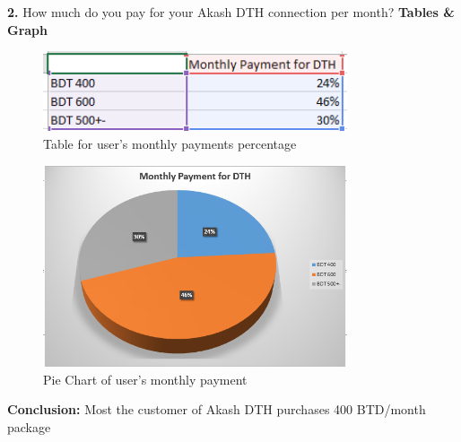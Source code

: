 \begin{spacing}{1}
{\bf 2.} How much do you pay for your Akash DTH connection per month?\newline
{\bf Tables \& Graph}\newline
\begin{figure}[H]
	\centering
	\includegraphics[width=0.8\textwidth]{fig2_1}
	\caption{Table for user's monthly payments percentage}
	\label{fig:Table1}
\end{figure}
\begin{figure}[H]
	\centering
	\includegraphics[width=0.8\textwidth]{fig2_2}
	\caption{Pie Chart of user's monthly payment}
	\label{fig:pieChar2}
\end{figure}
{\bf Conclusion: }\newline
Most the customer of Akash DTH purchases 400 BTD/month package


\end{spacing}
